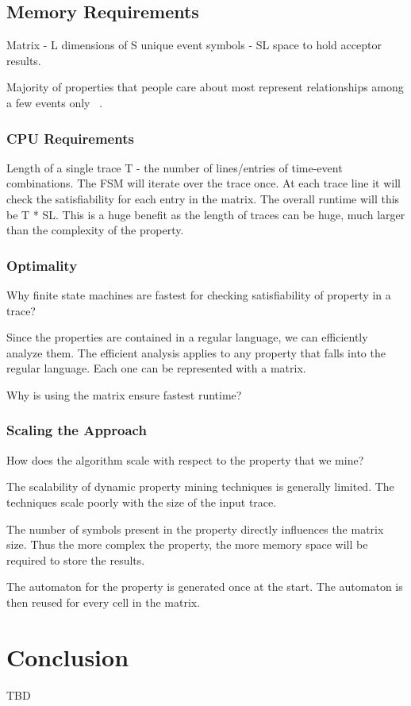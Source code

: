 \documentclass[]{sigplanconf}
\begin{document}
\subsection{Memory Requirements}

Matrix - L dimensions of S unique event symbols - SL space to hold acceptor results.

Majority of properties that people care about most represent relationships among a few events only ~\cite{evans1, dwyer}.

\subsubsection{CPU Requirements}

Length of a single trace T - the number of lines/entries of time-event combinations. 
The FSM will iterate over the trace once. At each trace line it will check the satisfiability for each entry in the matrix. The overall runtime will this be T * SL. 
This is a huge benefit as the length of traces can be huge, much larger than the complexity of the property. 

\subsubsection{Optimality}

Why finite state machines are fastest for checking satisfiability of property in a trace? 

Since the properties are contained in a regular language, we can efficiently analyze them. The efficient analysis applies to any property that falls into the regular language. Each one can be represented with a matrix. 

Why is using the matrix ensure fastest runtime?

\subsubsection{Scaling the Approach}

How does the algorithm scale with respect to the property that we mine?

The scalability of dynamic property mining techniques is generally limited.
The techniques scale poorly with the size of the input trace. 


The number of symbols present in the property directly influences the matrix size. Thus the more complex the property, the more memory space will be required to store the results. 

The automaton for the property is generated once at the start. The automaton is then reused for every cell in the matrix.

\section{Conclusion}

TBD


%


\end{document}
